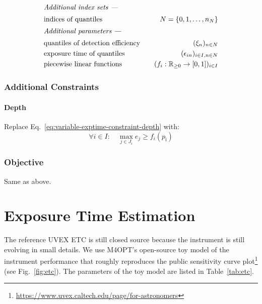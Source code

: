 \documentclass[twocolumn,times]{aastex631}
\begin{document}
\begin{alignat*}{3}
\intertext{\it Additional index sets ---}
    &\text{indices of quantiles}&\quad
        N = \{0, 1, \dots, n_N\} \\
\intertext{\it Additional parameters ---}
    &\text{quantiles of detection efficiency}&\quad
        (\xi_n)_{n \in N} \\
    &\text{exposure time of quantiles}&\quad
        (\epsilon_{in})_{i \in I, n \in N} \\
    &\text{piecewise linear functions}&\quad
        (f_i: \mathbb{R}_{\geq 0} \rightarrow [0, 1])_{i \in I}
\end{alignat*}


\subsubsection{Additional Constraints}

\paragraph{Depth}
Replace Eq.~\ref{eq:variable-exptime-constraint-depth} with:
%
$$
    \forall i \in I :\quad \max_{j \in J_i} e_{j} \geq f_i(p_\mathrm{i})
$$

\subsubsection{Objective}

Same as above.

\section{Exposure Time Estimation}

The reference \ac{UVEX} \ac{ETC} is still closed source because the instrument is still evolving in small details. We use \ac{M4OPT}'s open-source toy model of the instrument performance that roughly reproduces the public sensitivity curve plot\footnote{\url{https://www.uvex.caltech.edu/page/for-astronomers}} (see Fig.~\ref{fig:etc}). The parameters of the toy model are listed in Table~\ref{tab:etc}.
\end{document}
